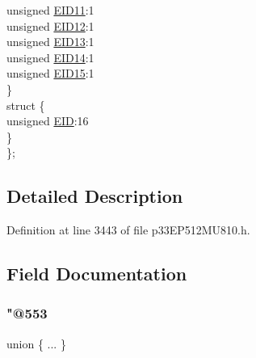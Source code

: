 \begin{DoxyCompactItemize}
\begin{tabbing}
\>\>unsigned \hyperlink{structtag_c1_r_x_m0_e_i_d_b_i_t_s_a710bdb0d602deb021b0be99066008018}{EID11}:1\\
\>\>unsigned \hyperlink{structtag_c1_r_x_m0_e_i_d_b_i_t_s_aa347bb85867bd8d4e0124f7cff8c6472}{EID12}:1\\
\>\>unsigned \hyperlink{structtag_c1_r_x_m0_e_i_d_b_i_t_s_a37d5f3edcbf6ef62f848fd4f3c584f79}{EID13}:1\\
\>\>unsigned \hyperlink{structtag_c1_r_x_m0_e_i_d_b_i_t_s_a7ffc0b0e0d99b8476b6f9a45337c17ab}{EID14}:1\\
\>\>unsigned \hyperlink{structtag_c1_r_x_m0_e_i_d_b_i_t_s_a293cd7dc1746257fa75a60cbd9383cd7}{EID15}:1\\
\>\} \\
\>struct \{\\
\>\>unsigned \hyperlink{structtag_c1_r_x_m0_e_i_d_b_i_t_s_ae80b378c9141f7c03e0b4e55b5f4b54d}{EID}:16\\
\>\} \\
\}; \\

\end{tabbing}\end{DoxyCompactItemize}


\subsection{Detailed Description}


Definition at line 3443 of file p33\+E\+P512\+M\+U810.\+h.



\subsection{Field Documentation}
\mbox{\label{structtag_c1_r_x_m0_e_i_d_b_i_t_s_a07e8e95bd40d28319a140b7c82e2dfbf}} 
\subsubsection{\texorpdfstring{"@553}{@553}}
{\footnotesize\ttfamily union \{ ... \} }

\mbox{\label{structtag_c1_r_x_m0_e_i_d_b_i_t_s_ae80b378c9141f7c03e0b4e55b5f4b54d}} 
